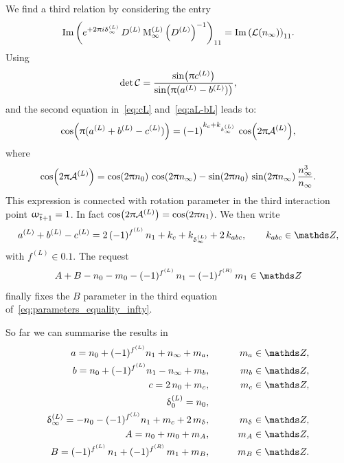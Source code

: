 We find a third relation by considering the entry
\begin{equation}
  \Im\qty(
    e^{+2\uppi i \updelta_{\infty}^{(L)}}\,
    D^{(L)}\,
    \mathrm{M}_{\infty}^{(L)}\,
    \qty( D^{(L)} )^{-1}
  )_{11}
  =
  \Im\qty(
    \mathcal{L}(n_{\infty})
  )_{11}.
\end{equation}
Using
\begin{equation}
  \det \mathcal{C}
  =
  \frac{\sin(\uppi c^{(L)})}{\sin(\uppi(a^{(L)}-b^{(L)}))},
\end{equation}
and the second equation in~\eqref{eq:cL} and~\eqref{eq:aL-bL} leads to:
\begin{equation}
  \cos(\uppi( a^{(L)} + b^{(L)} - c^{(L)} ))
  =
  (-1)^{k_c+k_{\updelta^{(L)}_{\infty}} }\, \cos(2\uppi \mathcal{A}^{(L)}),
\end{equation}
where
\begin{equation}
  \cos(2\uppi \mathcal{A}^{(L)})
  =
  \cos(2\uppi n_{0})\,
  \cos(2\uppi n_{\infty})
  -
  \sin(2\uppi n_{0})\,
  \sin(2\uppi n_{\infty})\,
  \frac{n_{\infty}^3}{n_{\infty}}.
\label{eq:cos_n1}
\end{equation}
This expression is connected with rotation parameter in the third interaction point $\upomega_{\overline{t}+1} = 1$.
In fact $\cos(2\uppi \mathcal{A}^{(L)}) = \cos(2\uppi {n}_{1})$.
We then write
\begin{equation}
  a^{(L)} + b^{(L)} - c^{(L)}
  =
  2\, (-1)^{f^{(L)}}\, n_{1}
  +
  k_c
  +
  k_{\delta^{(L)}_{\infty}}
  +
  2\, k_{abc},
  \qquad
  k_{abc}\in \Z,
\end{equation}
with $f^{(L)} \in \qty{ 0, 1 }$.
The request
\begin{equation}
  A
  +
  B
  -
  n_{0}
  -
  m_{0}
  -
  (-1)^{f^{(L)}}\, n_{1}
  -
  (-1)^{f^{(R)}}\, m_{1}
  \in \Z
\end{equation}
finally fixes the $B$ parameter in the third equation of~\eqref{eq:parameters_equality_infty}.

So far we can summarise the results in
\begin{eqnarray}
  a
  =
  n_{0} + (-1)^{f^{(L)}} n_{1} + n_{\infty} + m_a,
  & \qquad &
  m_a \in \Z,
  \\
  b
  =
  n_{0} + (-1)^{f^{(L)}} n_{1} - n_{\infty} + m_b,
  & \qquad &
  m_b \in \Z,
  \\
  c
  =
  2\, n_{0} + m_c,
  & \qquad &
  m_c \in \Z,
  \\
  \delta_{0}^{(L)}
  =
  n_{0},
  \\
  \delta_{\infty}^{(L)}
  =
  - n_{0} - (-1)^{f^{(L)}} n_{1} + m_c + 2\, m_\delta,
  & \qquad &
  m_{\delta} \in \Z,
  \\
  A
  =
  n_{0} + m_{0} + m_A,
  & \qquad &
  m_A \in \Z,
  \\
  B
  =
  (-1)^{f^{(L)}}\, n_{1} + (-1)^{f^{(R)}}\, m_{1} + m_B,
  & \qquad &
  m_B \in \Z.
\end{eqnarray}

